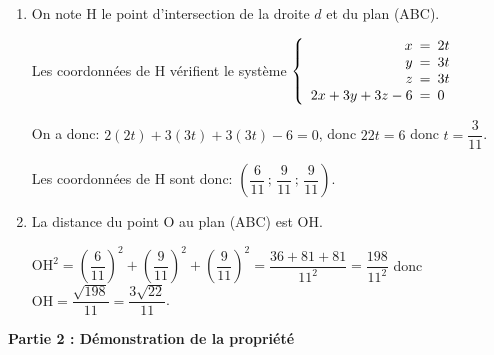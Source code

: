 \documentclass[10pt]{article}
\begin{document}
\begin{enumerate}
\item On note H le point d'intersection de la droite $d$ et du plan (ABC).

Les coordonnées de H vérifient le système
$\left \{
\begin{array}{r !{=} l}
x & 2t\\
y & 3t\\
z & 3t\\
2x+3y+3z-6& 0
\end{array}
\right . $

On a donc: $2\left (2t\right )+3\left (3t\right )+3\left (3t\right )-6= 0$, donc 
$22t=6$ donc $t=\dfrac{3}{11}$.

Les coordonnées de H sont donc: $\left (\dfrac{6}{11}\,;\, \dfrac{9}{11}\,;\, \dfrac{9}{11} \right )$.


\item La distance du point O au plan (ABC) est OH.

$\text{OH}^2=\left (\dfrac{6}{11} \right )^2 + \left (\dfrac{9}{11} \right )^2 + \left (\dfrac{9}{11} \right )^2 = \dfrac{36+81+81}{11^2}=\dfrac{198}{11^2}$
donc $\text{OH} = \dfrac{\sqrt{198}}{11}=\dfrac{3\sqrt{22}}{11}$.
\end{enumerate}

\bigskip

\textbf{Partie 2 : Démonstration de la propriété}
\end{document}
